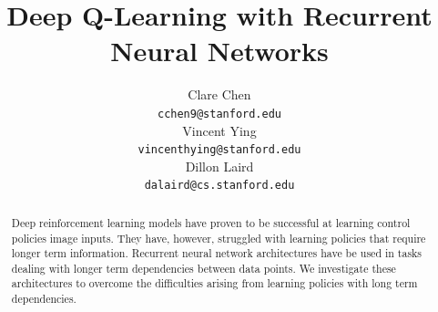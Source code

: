 \documentclass{article}
\title{Deep Q-Learning with Recurrent Neural Networks}
\author{
  Clare Chen \\
  \texttt{cchen9@stanford.edu} \\
  \And
  Vincent Ying \\
  \texttt{vincenthying@stanford.edu} \\
  \And
  Dillon Laird \\
  \texttt{dalaird@cs.stanford.edu} \\
}
\begin{document}

\maketitle

\begin{abstract}
  Deep reinforcement learning models have proven to be successful at learning
  control policies image inputs. They have, however, struggled with learning
  policies that require longer term information. Recurrent neural network
  architectures have be used in tasks dealing with longer term dependencies
  between data points. We investigate these architectures to overcome the
  difficulties arising from learning policies with long term dependencies.
\end{abstract}
\end{document}

